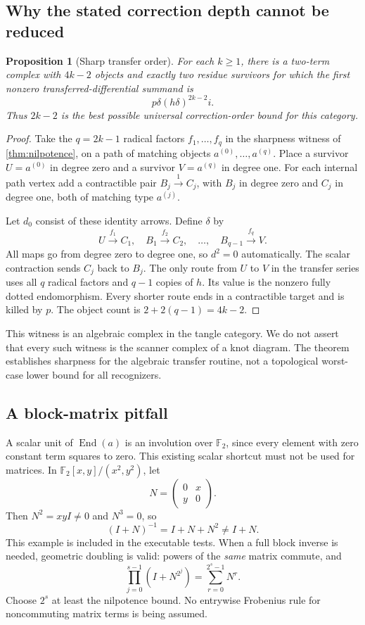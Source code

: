 \documentclass[11pt,letterpaper]{article}
\newtheorem{proposition}[theorem]{Proposition}
\theoremstyle{definition}
\theoremstyle{remark}
\newcommand{\F}{\mathbb F_2}
\newcommand{\End}{\operatorname{End}}
\begin{document}
\subsection{Why the stated correction depth cannot be reduced}
\begin{proposition}[Sharp transfer order]\label{prop:sharptransfer}
For each $k\geq1$, there is a two-term complex with $4k-2$ objects and exactly
two residue survivors for which the first nonzero transferred-differential
summand is
\[
 p\delta(h\delta)^{2k-2}i.
\]
Thus $2k-2$ is the best possible universal correction-order bound for this
category.
\end{proposition}
\begin{proof}
Take the $q=2k-1$ radical factors $f_1,\ldots,f_q$ in the sharpness witness
of \cref{thm:nilpotence}, on a path of matching objects
$a^{(0)},\ldots,a^{(q)}$. Place a survivor $U=a^{(0)}$ in degree zero and a
survivor $V=a^{(q)}$ in degree one. For each internal path vertex add a
contractible pair $B_j\xrightarrow{1}C_j$, with $B_j$ in degree zero and
$C_j$ in degree one, both of matching type $a^{(j)}$.

Let $d_0$ consist of these identity arrows. Define $\delta$ by
\[
 U\xrightarrow{f_1}C_1,\quad
 B_1\xrightarrow{f_2}C_2,\quad\ldots,\quad
 B_{q-1}\xrightarrow{f_q}V.
\]
All maps go from degree zero to degree one, so $d^2=0$ automatically.
The scalar contraction sends $C_j$ back to $B_j$. The only route from $U$
to $V$ in the transfer series uses all $q$ radical factors and $q-1$ copies of
$h$. Its value is the nonzero fully dotted endomorphism. Every shorter route
ends in a contractible target and is killed by $p$. The object count is
$2+2(q-1)=4k-2$.
\end{proof}

This witness is an algebraic complex in the tangle category. We do not assert
that every such witness is the scanner complex of a knot diagram. The theorem
establishes sharpness for the algebraic transfer routine, not a topological
worst-case lower bound for all recognizers.

\subsection{A block-matrix pitfall}
A scalar unit of $\End(a)$ is an involution over $\F$, since every element
with zero constant term squares to zero. This existing scalar shortcut must
not be used for matrices. In $\F[x,y]/(x^2,y^2)$, let
\[
 N=\begin{pmatrix}0&x\\y&0\end{pmatrix}.
\]
Then $N^2=xyI\ne0$ and $N^3=0$, so
\[
 (I+N)^{-1}=I+N+N^2\ne I+N.
\]
This example is included in the executable tests. When a full block inverse is
needed, geometric doubling is valid: powers of the \emph{same} matrix commute,
and
\[
 \prod_{j=0}^{s-1}(I+N^{2^j})=\sum_{r=0}^{2^s-1}N^r.
\]
Choose $2^s$ at least the nilpotence bound. No entrywise Frobenius rule for
noncommuting matrix terms is being assumed.
\end{document}

